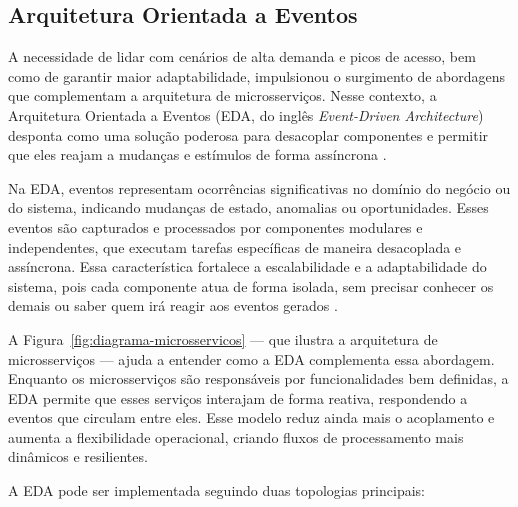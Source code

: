 \subsection{Arquitetura Orientada a Eventos}

A necessidade de lidar com cenários de alta demanda e picos de acesso, bem como de garantir maior adaptabilidade, impulsionou o surgimento de abordagens que complementam a arquitetura de microsserviços. Nesse contexto, a Arquitetura Orientada a Eventos (EDA, do inglês \textit{Event-Driven Architecture}) desponta como uma solução poderosa para desacoplar componentes e permitir que eles reajam a mudanças e estímulos de forma assíncrona \citep{Michelson2006}.

Na EDA, eventos representam ocorrências significativas no domínio do negócio ou do sistema, indicando mudanças de estado, anomalias ou oportunidades. Esses eventos são capturados e processados por componentes modulares e independentes, que executam tarefas específicas de maneira desacoplada e assíncrona. Essa característica fortalece a escalabilidade e a adaptabilidade do sistema, pois cada componente atua de forma isolada, sem precisar conhecer os demais ou saber quem irá reagir aos eventos gerados \citep{10.5555/2904417, lazzari2021}.

A Figura~\ref{fig:diagrama-microsservicos} — que ilustra a arquitetura de microsserviços — ajuda a entender como a EDA complementa essa abordagem. Enquanto os microsserviços são responsáveis por funcionalidades bem definidas, a EDA permite que esses serviços interajam de forma reativa, respondendo a eventos que circulam entre eles. Esse modelo reduz ainda mais o acoplamento e aumenta a flexibilidade operacional, criando fluxos de processamento mais dinâmicos e resilientes.

A EDA pode ser implementada seguindo duas topologias principais:

